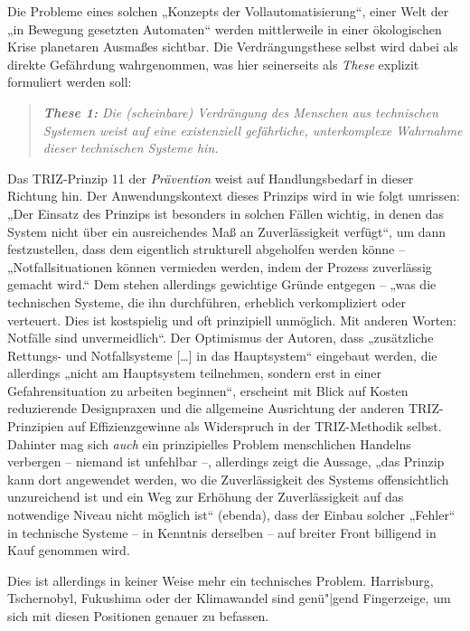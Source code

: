 \documentclass[12pt,a4paper]{article}
\begin{document}
Die Probleme eines solchen „Konzepts der Vollautomatisierung“, einer Welt der
„in Bewegung gesetzten Automaten“ werden mittlerweile in einer ökologischen
Krise planetaren Ausmaßes sichtbar. Die Verdrängungsthese selbst wird dabei
als direkte Gefährdung wahrgenommen, was hier seinerseits als \emph{These}
explizit formuliert werden soll:
\begin{quote}\it
  \textbf{These 1:} Die (scheinbare) Verdrängung des Menschen aus technischen
  Systemen weist auf eine existenziell gefährliche, unterkomplexe Wahrnahme
  dieser technischen Systeme hin.
\end{quote}
Das TRIZ-Prinzip 11 der \emph{Prävention} weist auf Handlungsbedarf in dieser
Richtung hin. Der Anwendungskontext dieses Prinzips wird in \cite{TT} wie
folgt umrissen: „Der Einsatz des Prinzips ist besonders in solchen Fällen
wichtig, in denen das System nicht über ein ausreichendes Maß an
Zuverlässigkeit verfügt“, um dann festzustellen, dass dem eigentlich
strukturell abgeholfen werden könne -- „Notfallsituationen können vermieden
werden, indem der Prozess zuverlässig gemacht wird.“ Dem stehen allerdings
gewichtige Gründe entgegen -- „was die technischen Systeme, die ihn
durchführen, erheblich verkompliziert oder verteuert. Dies ist kostspielig und
oft prinzipiell unmöglich. Mit anderen Worten: Notfälle sind
unvermeidlich“. Der Optimismus der Autoren, dass „zusätzliche Rettungs- und
Notfallsysteme [\ldots] in das Hauptsystem“ eingebaut werden, die allerdings
„nicht am Hauptsystem teilnehmen, sondern erst in einer Gefahrensituation zu
arbeiten beginnen“, erscheint mit Blick auf Kosten reduzierende Designpraxen
und die allgemeine Ausrichtung der anderen TRIZ-Prinzipien auf
Effizienzgewinne als Widerspruch in der TRIZ-Methodik selbst.  Dahinter mag
sich \emph{auch} ein prinzipielles Problem menschlichen Handelns verbergen --
niemand ist unfehlbar --, allerdings zeigt die Aussage, „das Prinzip kann dort
angewendet werden, wo die Zuverlässigkeit des Systems offensichtlich
unzureichend ist und ein Weg zur Erhöhung der Zuverlässigkeit auf das
notwendige Niveau nicht möglich ist“ (ebenda), dass der Einbau solcher
„Fehler“ in technische Systeme -- in Kenntnis derselben -- auf breiter Front
billigend in Kauf genommen wird.

Dies ist allerdings in keiner Weise mehr ein technisches Problem.  Harrisburg,
Tschernobyl, Fukushima oder der Klimawandel sind genü"|gend Fingerzeige, um
sich mit diesen Positionen genauer zu befassen.
\end{document}
